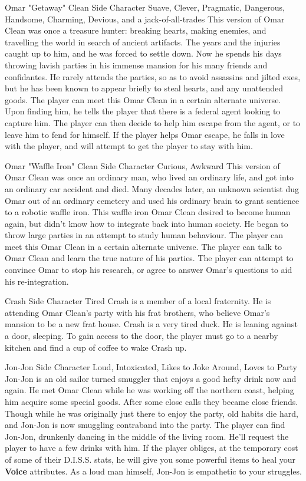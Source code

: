 {Omar "Getaway" Clean}
{Side Character}
{Suave, Clever, Pragmatic, Dangerous, Handsome, Charming, Devious, and a jack-of-all-trades}
{This version of Omar Clean was once a treasure hunter: breaking hearts, making enemies, and travelling the world in search of ancient artifacts. The years and the injuries caught up to him, and he was forced to settle down. Now he spends his days throwing lavish parties in his immense mansion for his many friends and confidantes. He rarely attends the parties, so as to avoid assassins and jilted exes, but he has been known to appear briefly to steal hearts, and any unattended goods.}
{The player can meet this Omar Clean in a certain alternate universe. Upon finding him, he tells the player that there is a federal agent looking to capture him. The player can then decide to help him escape from the agent, or to leave him to fend for himself. If the player helps Omar escape, he falls in love with the player, and will attempt to get the player to stay with him.}

{Omar "Waffle Iron" Clean}
{Side Character}
{Curious, Awkward}
{This version of Omar Clean was once an ordinary man, who lived an ordinary life, and got into an ordinary car accident and died. Many decades later, an unknown  scientist dug Omar out of an ordinary cemetery and used his ordinary brain to grant sentience to a robotic waffle iron. This waffle iron Omar Clean desired to become human again, but didn't know how to integrate back into human society. He began to throw large parties in an attempt to study human behaviour.}
{The player can meet this Omar Clean in a certain alternate universe. The player can talk to Omar Clean and learn the true nature of his parties. The player can attempt to convince Omar to stop his research, or agree to answer Omar's questions to aid his re-integration.}

{Crash}
{Side Character}
{Tired}
{Crash is a member of a local fraternity. He is attending Omar Clean's party with his frat brothers, who believe Omar's mansion to be a new frat house.}
{Crash is a very tired duck. He is leaning against a door, sleeping. To gain access to the door, the player must go to a nearby kitchen and find a cup of coffee to wake Crash up.}

{Jon-Jon}
{Side Character}
{Loud, Intoxicated, Likes to Joke Around, Loves to Party}
{Jon-Jon is an old sailor turned smuggler that enjoys a good hefty drink now and again. He met Omar Clean while he was working off the northern coast, helping him acquire some special goods. After some close calls they became close friends. Though while he was originally just there to enjoy the party, old habits die hard, and Jon-Jon is now smuggling contraband into the party.}
{The player can find Jon-Jon, drunkenly dancing in the middle of the living room. He'll request the player to have a few drinks with him. If the player obliges, at the temporary cost of some of their D.I.S.S. stats, he will give you some powerful items to heal your \textbf{Voice} attributes. As a loud man himself, Jon-Jon is empathetic to your struggles.}

